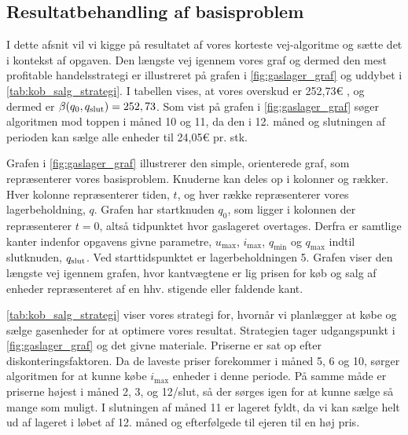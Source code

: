 \subsection{Resultatbehandling af basisproblem}

I dette afsnit vil vi kigge på resultatet af vores korteste vej-algoritme og sætte det i kontekst af opgaven. Den længste vej igennem vores graf og dermed den mest profitable handelsstrategi er illustreret på grafen i \autoref{fig:gaslager_graf} og uddybet i \autoref{tab:kob_salg_strategi}. I tabellen vises, at vores overskud er 252,73€ %
, og dermed er $\beta (q_0, q_{\textrm{slut}}) = 252,73$. Som vist på grafen i \autoref{fig:gaslager_graf} søger algoritmen mod toppen i måned 10 og 11, da den i 12. måned og slutningen af perioden kan sælge alle enheder til 24,05€ pr. stk. 



Grafen i \autoref{fig:gaslager_graf} illustrerer den simple, orienterede graf, som repræsenterer vores basisproblem. Knuderne kan deles op i kolonner og rækker. Hver kolonne repræsenterer tiden, $t$, og hver række repræsenterer vores lagerbeholdning, $q$. Grafen har startknuden $q_0$, som ligger i kolonnen der repræsenterer $t=0$, altså tidpunktet hvor gaslageret overtages. Derfra er samtlige kanter indenfor opgavens givne parametre, $u_{\max }$, $i_{\max }$, $q_{\min }$ og $q_{\max }$ indtil slutknuden, $q_{\textrm{slut}}$. Ved starttidspunktet er lagerbeholdningen 5. Grafen viser den længste vej igennem grafen, hvor kantvægtene er lig prisen for køb og salg af enheder repræsenteret af en hhv. stigende eller faldende kant.



\autoref{tab:kob_salg_strategi} viser vores strategi for, hvornår vi planlægger at købe og sælge gasenheder for at optimere vores resultat. Strategien tager udgangspunkt i \autoref{fig:gaslager_graf} og det givne materiale. Priserne er sat op efter diskonteringsfaktoren.%
Da de laveste priser forekommer i måned 5, 6 og 10, sørger algoritmen for at kunne købe $i_{\max}$ enheder i denne periode. På samme måde er priserne højest i måned 2, 3, og 12/slut, så der sørges igen for at kunne sælge så mange som muligt. I slutningen af måned 11 er lageret fyldt, da vi kan sælge helt ud af lageret i løbet af 12. måned og efterfølgede til ejeren til en høj pris.
